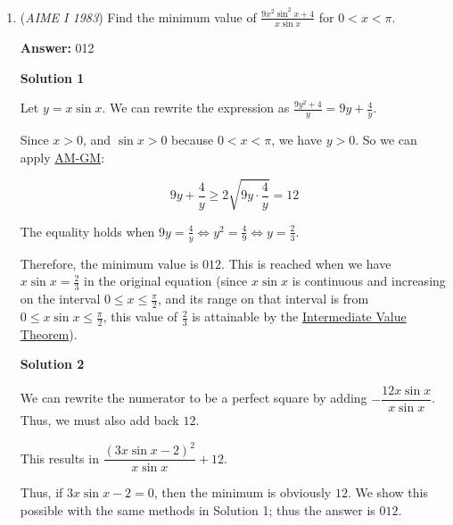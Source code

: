 \begin{enumerate}
 So basically, $p$ is the largest prime number such that
 \[\left \lfloor\frac{200}{p}\right \rfloor>3\]Since $p<\frac{200}{3}=66.66...$, the largest prime value for $p$ is $p=\boxed{61}$

 \textbf{Note} Similar to 2023 MATHCOUNTS State Sprint \#25

 \textbf{Comment} which came first, 1985 or 2023?

 


	\item (\textit{AIME I 1983}) Find the minimum value of $\frac{9x^2\sin^2 x + 4}{x\sin x}$ for $0 < x < \pi$.


 
 \textbf{Answer: }012



\textbf{Solution 1}

Let $y=x\sin{x}$. We can rewrite the expression as $\frac{9y^2+4}{y}=9y+\frac{4}{y}$.

 Since $x>0$, and $\sin{x}>0$ because $0< x<\pi$, we have $y>0$. So we can apply \href{https://artofproblemsolving.com/wiki/index.php?title=AM-GM}{AM-GM}:

 
 \[9y+\frac{4}{y}\ge 2\sqrt{9y\cdot\frac{4}{y}}=12\]

 The equality holds when $9y=\frac{4}{y}\Longleftrightarrow y^2=\frac49\Longleftrightarrow y=\frac23$.

 Therefore, the minimum value is $\boxed{012}$. This is reached when we have $x \sin{x} = \frac{2}{3}$ in the original equation (since $x\sin x$ is continuous and increasing on the interval $0 \le x \le \frac{\pi}{2}$, and its range on that interval is from $0 \le x\sin x \le \frac{\pi}{2}$, this value of $\frac{2}{3}$ is attainable by the \href{https://artofproblemsolving.com/wiki/index.php?title=Intermediate\_Value\_Theorem}{Intermediate Value Theorem}).

 



\textbf{Solution 2}

We can rewrite the numerator to be a perfect square by adding $-\dfrac{12x \sin x}{x \sin x}$. Thus, we must also add back $12$.

 This results in $\dfrac{(3x \sin x-2)^2}{x \sin x}+12$.

 Thus, if $3x \sin x-2=0$, then the minimum is obviously $12$. We show this possible with the same methods in Solution 1; thus the answer is $\boxed{012}$.

 




\end{enumerate}
